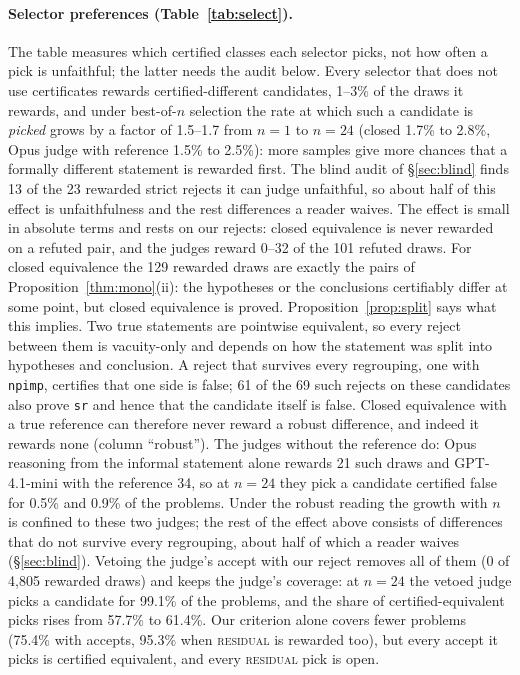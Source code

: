 \documentclass[10pt]{article}
\theoremstyle{definition}
\newcommand{\V}[1]{\textsc{#1}}
\begin{document}
\paragraph{Selector preferences (Table~\ref{tab:select}).} The table measures which certified
classes each selector picks, not how often a pick is unfaithful; the latter needs the audit below.
Every selector that does not use certificates
rewards certified-different candidates, 1--3\% of the draws it rewards, and under best-of-$n$
selection the rate at which such a candidate is \emph{picked} grows by a factor of 1.5--1.7 from
$n=1$ to $n=24$ (closed 1.7\% to 2.8\%, Opus judge with reference 1.5\% to 2.5\%): more samples
give more chances that a formally different statement is rewarded first. The blind audit of
\S\ref{sec:blind} finds 13 of the 23 rewarded strict rejects it can judge unfaithful, so about
half of this effect is unfaithfulness and the rest differences a reader waives. The effect is small
in absolute terms and rests on our rejects: closed equivalence is never rewarded on a refuted
pair, and the judges reward 0--32 of the 101 refuted draws. For closed equivalence the 129
rewarded draws are exactly the pairs of Proposition~\ref{thm:mono}(ii): the hypotheses or the
conclusions certifiably differ at some point, but closed equivalence is proved.
Proposition~\ref{prop:split} says what this implies. Two true statements are pointwise
equivalent, so every reject between them is vacuity-only and depends on how the statement was
split into hypotheses and conclusion. A reject that survives every regrouping, one with
\texttt{npimp}, certifies that one side is false; 61 of the 69 such rejects on these candidates
also prove \texttt{sr} and hence that the candidate itself is false. Closed equivalence with a
true reference can therefore never reward a robust difference, and indeed it rewards none
(column ``robust''). The judges without the reference do: Opus reasoning from the informal
statement alone rewards 21 such draws and GPT-4.1-mini with the reference 34, so at $n=24$ they
pick a candidate certified false for 0.5\% and 0.9\% of the problems. Under the robust reading the
growth with $n$ is confined to these two judges; the rest of the effect above consists of
differences that do not survive every regrouping, about half of which a reader waives
(\S\ref{sec:blind}). Vetoing the judge's accept with our reject removes
all of them (0 of 4,805 rewarded draws) and keeps
the judge's coverage: at $n=24$ the vetoed judge picks a candidate for 99.1\% of the problems, and
the share of certified-equivalent picks rises from 57.7\% to 61.4\%. Our criterion alone covers
fewer problems (75.4\% with accepts, 95.3\% when \V{residual} is rewarded too), but every
accept it picks is certified equivalent, and every \V{residual} pick is open.
\end{document}

